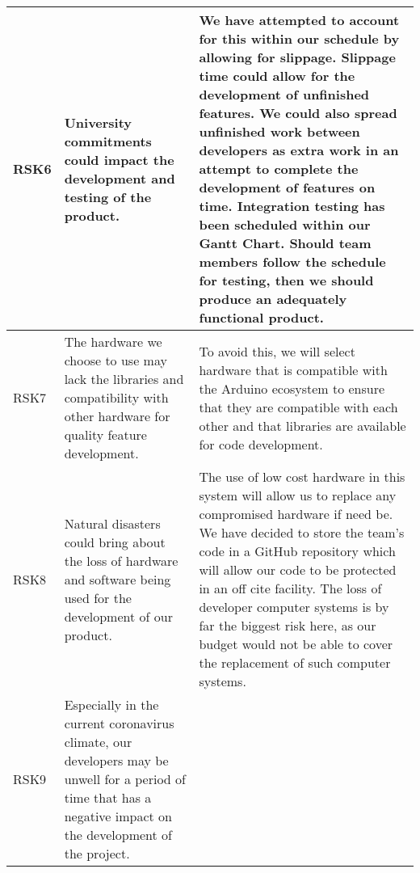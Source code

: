 \begin{xltabular}[H]{1.4\textwidth}{p{0.1\textwidth} | p{0.4\textwidth} | p{0.9\textwidth}}
    \midrule

    RSK6

    &

    University commitments could impact the development and testing of the product.

    &

    We have attempted to account for this within our schedule by allowing for slippage. Slippage time could allow for the development of unfinished features. We could also spread unfinished work between developers as extra work in an attempt to complete the development of features on time. \textbf{Integration testing has been scheduled within our Gantt Chart. Should team members follow the schedule for testing, then we should produce an adequately functional product.}\\

    \midrule

    RSK7

    &

    The hardware we choose to use may lack the libraries and compatibility with other hardware for quality feature development.

    &

    To avoid this, we will select hardware that is compatible with the Arduino ecosystem to ensure that they are compatible with each other and that libraries are available for code development.\\

    \midrule

    RSK8

    &

    Natural disasters could bring about the loss of hardware and software being used for the development of our product.

    &

    The use of low cost hardware in this system will allow us to replace any compromised hardware if need be. We have decided to store the team's code in a GitHub repository which will allow our code to be protected in an off cite facility. The loss of developer computer systems is by far the biggest risk here, as our budget would not be able to cover the replacement of such computer systems.\\

    \midrule

    RSK9

    &

    Especially in the current coronavirus climate, our developers may be unwell for a period of time that has a negative impact on the development of the project.


\end{xltabular}
